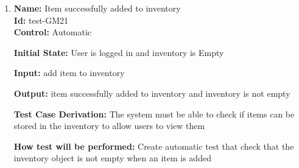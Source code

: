 \documentclass[12pt, titlepage]{article}
\begin{document}
\begin{enumerate}
\item{\textbf{Name:} Item successfully added to inventory \\} %
\textbf{Id:} test-GM21 \label{Test-GM21}\\

\textbf{Control:} Automatic

\textbf{Initial State:} User is logged in and inventory is Empty

\textbf{Input:} add item to inventory

\textbf{Output:} item successfully added to inventory and inventory is not empty

\textbf{Test Case Derivation:} The system must be able to check if items can be stored in the inventory to allow users to view them

\textbf{How test will be performed: }Create automatic test that check that the inventory object is not empty when an item is added

\end{enumerate}
\end{document}
